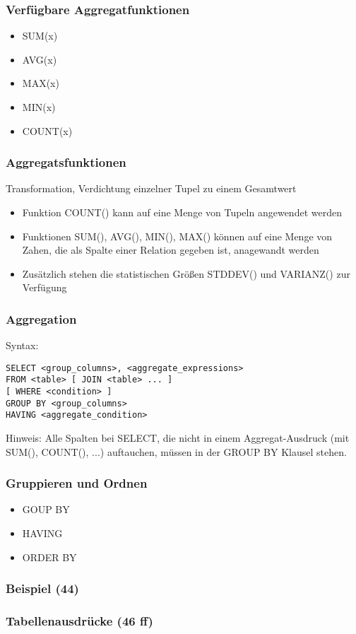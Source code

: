 \subsubsection{Verfügbare Aggregatfunktionen}
\begin{itemize}
	\item SUM(x)
	\item AVG(x)
	\item MAX(x)
	\item MIN(x)
	\item COUNT(x)
\end{itemize}
\subsubsection{Aggregatsfunktionen}
Transformation, Verdichtung einzelner Tupel zu einem Gesamtwert
\begin{itemize}
	\item Funktion COUNT() kann auf eine Menge von Tupeln angewendet werden
	\item Funktionen SUM(), AVG(), MIN(), MAX() können auf eine Menge von Zahen, die als Spalte einer Relation gegeben ist, anagewandt werden
	\item Zusätzlich stehen die statistischen Größen STDDEV() und VARIANZ() zur Verfügung
\end{itemize}
\subsubsection{Aggregation}
Syntax: 
\begin{lstlisting}
SELECT <group_columns>, <aggregate_expressions>
FROM <table> [ JOIN <table> ... ]
[ WHERE <condition> ]
GROUP BY <group_columns>
HAVING <aggregate_condition>
\end{lstlisting}
Hinweis: Alle Spalten bei SELECT, die nicht in einem Aggregat-Ausdruck (mit SUM(), COUNT(), ...) auftauchen, müssen in der GROUP BY Klausel stehen.
\subsubsection{Gruppieren und Ordnen}
\begin{itemize}
	\item GOUP BY
	\item HAVING
	\item ORDER BY
\end{itemize}
\subsubsection{Beispiel (44)}
\subsubsection{Tabellenausdrücke (46 ff)}

